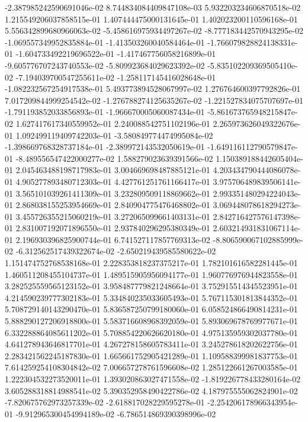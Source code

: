 -2.387985242590691046e-02
8.744834084409847108e-03
5.932203234606870518e-02
1.215549206037858515e-01
1.407444475000131645e-01
1.402023200110596168e-01
5.556342899680966063e-02
-5.458616975934497267e-02
-8.777183442570943295e-02
-1.069557349952835884e-01
-1.413503260040584464e-01
-1.766079828824138331e-01
-1.604733492219696522e-01
-1.417467756058216899e-01
-9.605776707243740553e-02
-5.809923684029623392e-02
-5.835102209369505410e-02
-7.194039700547255611e-02
-1.258117145416028648e-01
-1.082232567254917538e-01
5.493773894528067997e-02
1.276764600397792826e-01
7.017209844999254542e-02
-1.276788274125635267e-02
-1.221527834075707697e-01
-1.791193852033856893e-01
-1.966670005060087434e-01
-5.861673765948215847e-02
1.627417617340559952e-01
2.240088542751102196e-01
2.265973626049322676e-01
1.092499119409742203e-01
-3.580849774474995084e-02
-1.398669768328737184e-01
-2.389972143532050619e-01
-1.649116112790579847e-01
-8.489556547422000277e-02
1.588279023639391566e-02
1.150389188442605404e-01
2.045463488198717983e-01
3.004669698487885121e-01
4.203434790444086078e-01
4.905277893480712303e-01
4.427761251761166417e-01
3.975706489839506141e-01
3.565101039261411309e-01
3.232809509118869662e-01
2.993351480294224043e-01
2.868038155253954669e-01
2.840904775476468802e-01
3.069448078618294273e-01
3.455726355215060219e-01
3.272065099661403131e-01
2.842716427576147398e-01
2.831007192071896550e-01
2.937840296295380349e-01
2.603214931831067114e-01
2.196930396825900744e-01
6.741527117857769313e-02
-8.806590067102885999e-02
-6.312562517439322674e-02
-2.650219439585580622e-02
1.151474752768538168e-01
2.228353818237375217e-01
1.782101616582281445e-01
1.460511208455104737e-01
1.489515905956094177e-01
1.960776976944823558e-01
3.282525559565123152e-01
3.958487779821248664e-01
3.752915514345523951e-01
4.214590239777302183e-01
5.334840235033605493e-01
5.767115301813844352e-01
5.708729140143290470e-01
5.836587250799180060e-01
6.058524866490814231e-01
5.888290127206918800e-01
5.583716608968392059e-01
5.893069678769977671e-01
6.332288864085611202e-01
5.708854220626620180e-01
4.975135959302037780e-01
4.641278943646817701e-01
4.267278158605783411e-01
3.245278618202622756e-01
2.283421562245187830e-01
1.665661752905421289e-01
1.109588399981837753e-01
7.614259254108304842e-02
7.006657278761596608e-02
1.285122661267003585e-01
1.222304532273520011e-01
1.393020863027471558e-02
-1.819226778433280164e-02
3.605288318814988541e-02
5.390352958490422786e-02
4.187975555062824901e-02
-7.820675762973257339e-02
-2.618817028229595278e-01
-2.254206178966343954e-01
-9.912965300454994189e-02
-6.786514869390398996e-02

